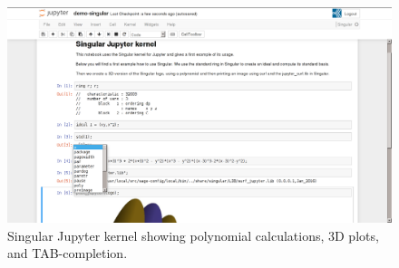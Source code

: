\documentclass{deliverablereport}
\begin{document}
\begin{figure}[ht]
  \includegraphics[width=140mm,trim={0 0 0 1px},clip]{singular.png}
  \caption{Singular Jupyter kernel showing polynomial
    calculations, 3D plots, and TAB-completion.}
\end{figure}
\clearpage
\end{document}
